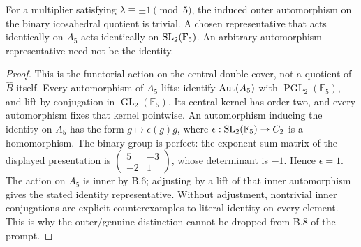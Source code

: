 For a multiplier satisfying \(\lambda\equiv\pm1\pmod5\),
the induced outer automorphism on the binary icosahedral quotient
is trivial. A chosen representative that acts identically on
\(A_5\) acts identically on \(\operatorname{SL}_2(\mathbb F_5)\).
An arbitrary automorphism representative need not be the identity.
\begin{proof}
This is the functorial action on the central double cover, not
a quotient of \(\widehat B\) itself. Every automorphism of
\(A_5\) lifts: identify \(\operatorname{Aut}(A_5)\) with
\(\operatorname{PGL}_2(\mathbb F_5)\), and lift by conjugation
in \(\operatorname{GL}_2(\mathbb F_5)\).
Its central kernel has order two, and every automorphism fixes
that kernel pointwise. An automorphism inducing the identity on
\(A_5\) has the form \(g\mapsto\epsilon(g)g\), where
\(\epsilon:\operatorname{SL}_2(\mathbb F_5)\to C_2\) is a homomorphism.
The binary group is perfect: the exponent-sum matrix of the
displayed presentation is
\(\left(\begin{smallmatrix}5&-3\\-2&1\end{smallmatrix}\right)\),
whose determinant is \(-1\). Hence \(\epsilon=1\).
The action on \(A_5\) is inner by B.6; adjusting by a lift
of that inner automorphism gives the stated identity representative.
Without adjustment, nontrivial inner conjugations are explicit
counterexamples to literal identity on every element. This is
why the outer/genuine distinction cannot be dropped from B.8
of the prompt.
\end{proof}
